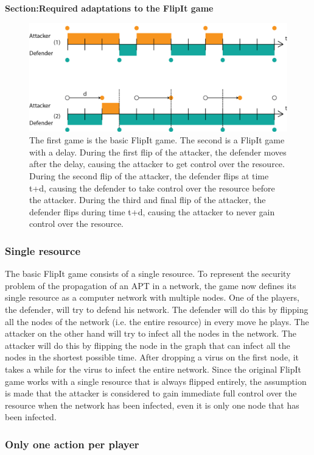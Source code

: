 \textbf{Section:Required adaptations to the FlipIt game}

\begin{figure}[hbtp]
\centering
\includegraphics[scale=0.7]{Images/dtFlip.png}
\caption{The first game is the basic FlipIt game. The second is a FlipIt game with a delay. During the first flip of the attacker, the defender moves after the delay, causing the attacker to get control over the resource. During the second flip of the attacker, the defender flips at time t+d, causing the defender to take control over the resource before the attacker. During the third and final flip of the attacker, the defender flips during time t+d, causing the attacker to never gain control over the resource. }
\label{dt}
\end{figure}
\subsubsection{Single resource}
The basic FlipIt game consists of a single resource. To represent the security problem of the propagation of an APT in a network, the game now defines its single resource as a computer network with multiple
nodes. One of the players, the defender, will try to defend his network. The defender
will do this by flipping all the nodes of the network (i.e. the entire resource) in every move he plays. The
attacker on the other hand will try to infect all the nodes in the network. The attacker
will do this by flipping the node in the graph that can infect all the nodes in the
shortest possible time. After dropping a virus on the first node, it takes a while for the virus to infect the entire network. Since the original FlipIt game works with a single resource that is always flipped entirely, the assumption is made that the attacker is considered to gain immediate full control over the resource when the network has been infected, even it is only one node that has been infected.\\
\subsubsection{Only one action per player}


